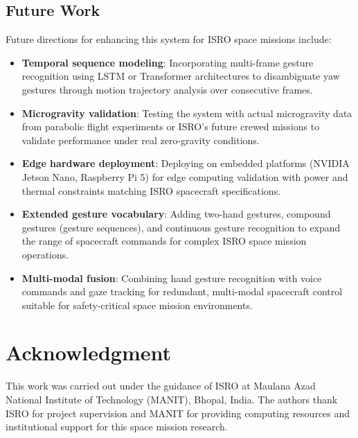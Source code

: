 \documentclass[conference]{IEEEtran}
\begin{document}
\subsection{Future Work}
Future directions for enhancing this system for ISRO space missions include:
\begin{itemize}
    \item \textbf{Temporal sequence modeling}: Incorporating multi-frame gesture recognition using LSTM or Transformer architectures to disambiguate yaw gestures through motion trajectory analysis over consecutive frames.
    \item \textbf{Microgravity validation}: Testing the system with actual microgravity data from parabolic flight experiments or ISRO's future crewed missions to validate performance under real zero-gravity conditions.
    \item \textbf{Edge hardware deployment}: Deploying on embedded platforms (NVIDIA Jetson Nano, Raspberry Pi 5) for edge computing validation with power and thermal constraints matching ISRO spacecraft specifications.
    \item \textbf{Extended gesture vocabulary}: Adding two-hand gestures, compound gestures (gesture sequences), and continuous gesture recognition to expand the range of spacecraft commands for complex ISRO space mission operations.
    \item \textbf{Multi-modal fusion}: Combining hand gesture recognition with voice commands and gaze tracking for redundant, multi-modal spacecraft control suitable for safety-critical space mission environments.
\end{itemize}

\section*{Acknowledgment}
This work was carried out under the guidance of ISRO at Maulana Azad National Institute of Technology (MANIT), Bhopal, India. The authors thank ISRO for project supervision and MANIT for providing computing resources and institutional support for this space mission research.
\end{document}
